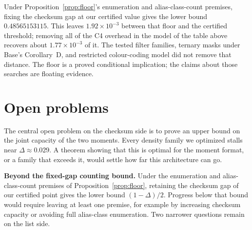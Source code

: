 \documentclass[11pt]{article}
\theoremstyle{plain}
\begin{document}
Under Proposition~\ref{prop:floor}'s enumeration and alias-class-count premises, fixing the checksum gap at our certified value gives the lower bound $0.48565153115$. This leaves $1.92\times10^{-3}$ between that floor and the certified threshold; removing all of the C4 overhead in the model of the table above recovers about $1.77\times10^{-3}$ of it. The tested filter families, ternary masks under Base's Corollary~D, and restricted colour-coding model did not remove that distance. The floor is a proved conditional implication; the claims about those searches are floating evidence.

\section{Open problems}

The central open problem on the checksum side is to prove an upper bound on the joint capacity of the two moments. Every density family we optimized stalls near $\Delta \approx 0.029$. A theorem showing that this is optimal for the moment format, or a family that exceeds it, would settle how far this architecture can go.

\textbf{Beyond the fixed-gap counting bound.} Under the enumeration and alias-class-count premises of Proposition~\ref{prop:floor}, retaining the checksum gap of our certified point gives the lower bound $(1-\Delta)/2$. Progress below that bound would require leaving at least one premise, for example by increasing checksum capacity or avoiding full alias-class enumeration. Two narrower questions remain on the list side.
\end{document}
